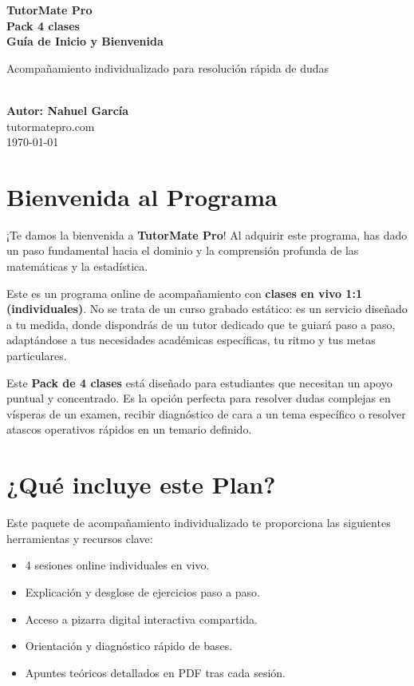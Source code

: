 \documentclass[11pt,a4paper]{article}
\begin{document}
\begin{titlepage}
    \centering
    \vspace*{2cm}
    {\Huge \color{primary} \textbf{TutorMate Pro}} \\[0.5cm]
    {\huge \color{accent} \textbf{Pack 4 clases}} \\[0.8cm]
    {\Large \color{gold} \textbf{Guía de Inicio y Bienvenida}} \\[1.5cm]
    
    \begin{minipage}{0.8\textwidth}
        \centering
        \large \color{primary} Acompañamiento individualizado para resolución rápida de dudas
    \end{minipage} \\[2cm]
    
    \vspace*{\fill}
    {\large \color{primary} \textbf{Autor: Nahuel García}} \\
    {\large \color{primary} tutormatepro.com} \\
    {\small \color{accent} \today}
\end{titlepage}

\newpage
\tableofcontents
\newpage

\section{Bienvenida al Programa}
¡Te damos la bienvenida a \textbf{TutorMate Pro}! Al adquirir este programa, has dado un paso fundamental hacia el dominio y la comprensión profunda de las matemáticas y la estadística. 

Este es un programa online de acompañamiento con \textbf{clases en vivo 1:1 (individuales)}. No se trata de un curso grabado estático: es un servicio diseñado a tu medida, donde dispondrás de un tutor dedicado que te guiará paso a paso, adaptándose a tus necesidades académicas específicas, tu ritmo y tus metas particulares.

Este \textbf{Pack de 4 clases} está diseñado para estudiantes que necesitan un apoyo puntual y concentrado. Es la opción perfecta para resolver dudas complejas en vísperas de un examen, recibir diagnóstico de cara a un tema específico o resolver atascos operativos rápidos en un temario definido.

\section{¿Qué incluye este Plan?}
Este paquete de acompañamiento individualizado te proporciona las siguientes herramientas y recursos clave:
\begin{itemize}
    \item 4 sesiones online individuales en vivo.
    \item Explicación y desglose de ejercicios paso a paso.
    \item Acceso a pizarra digital interactiva compartida.
    \item Orientación y diagnóstico rápido de bases.
    \item Apuntes teóricos detallados en PDF tras cada sesión.
\end{itemize}
\end{document}
